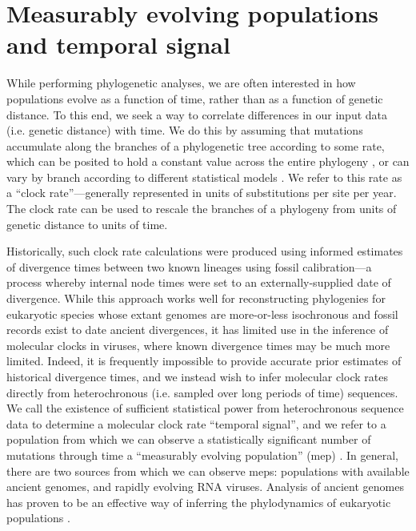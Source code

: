 \section{Measurably evolving populations and temporal signal}

While performing phylogenetic analyses, we are often interested in how populations evolve as a function of time, rather than as a function of genetic distance.
To this end, we seek a way to correlate differences in our input data (i.e. genetic distance) with time.
We do this by assuming that mutations accumulate along the branches of a phylogenetic tree according to some rate, which can be posited to hold a constant value across the entire phylogeny \cite{brown2011rate}, or can vary by branch according to different statistical models \cite{drummond2006relaxed, drummond2010randomLocal}.
We refer to this rate as a ``clock rate''---generally represented in units of substitutions per site per year.
The clock rate can be used to rescale the branches of a phylogeny from units of genetic distance to units of time.

Historically, such clock rate calculations were produced using informed estimates of divergence times between two known lineages using fossil calibration\cite{smith2010birds, near2005turtles}---a process whereby internal node times were set to an externally-supplied date of divergence.
While this approach works well for reconstructing phylogenies for eukaryotic species whose extant genomes are more-or-less isochronous and fossil records exist to date ancient divergences, it has limited use in the inference of molecular clocks in viruses, where known divergence times may be much more limited.
Indeed, it is frequently impossible to provide accurate prior estimates of historical divergence times, and we instead wish to infer molecular clock rates directly from heterochronous (i.e. sampled over long periods of time) sequences.
We call the existence of sufficient statistical power from heterochronous sequence data to determine a molecular clock rate ``temporal signal'', and we refer to a population from which we can observe a statistically significant number of mutations through time a ``measurably evolving population'' (\gls{mep}) \cite{drummond2003measurably}. %
In general, there are two sources from which we can observe \gls{mep}s: populations with available ancient genomes, and rapidly evolving RNA viruses.
Analysis of ancient genomes has proven to be an effective way of inferring the phylodynamics of eukaryotic populations \cite{shapiro2004bison}. %

